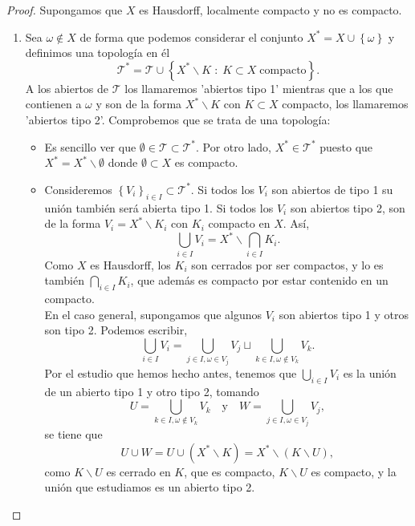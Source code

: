 \begin{proof}
Supongamos que $\displaystyle X $ es Hausdorff, localmente compacto y no es compacto.
\begin{enumerate}
	\item Sea $\displaystyle \omega \not\in X $ de forma que podemos considerar el conjunto $\displaystyle X^{*}=X \cup \left\{ \omega \right\}  $ y definimos una topología en él
		\[\mathcal{T}^{*}=\mathcal{T}\cup \left\{ X^{*}\backslash K \; :\; K \subset X \; \text{compacto}\right\}  .\]
	A los abiertos de $\displaystyle \mathcal{T} $ los llamaremos 'abiertos tipo 1' mientras que a los que contienen a $\displaystyle \omega  $ y son de la forma $\displaystyle X^{*} \backslash K $ con $\displaystyle K\subset X $ compacto, los llamaremos 'abiertos tipo 2'. Comprobemos que se trata de una topología:
	\begin{itemize}
	\item Es sencillo ver que $\displaystyle \emptyset \in \mathcal{T}\subset \mathcal{T}^{*} $. Por otro lado, $\displaystyle X^{*}\in \mathcal{T}^{*} $ puesto que $\displaystyle X^{*}=X^{*}\backslash \emptyset  $ donde $\displaystyle \emptyset \subset X $ es compacto.
	\item Consideremos $\displaystyle \left\{ V_{i}\right\} _{i \in I}\subset \mathcal{T}^{*} $. Si todos los $\displaystyle V_{i} $ son abiertos de tipo 1 su unión también será abierta tipo 1. Si todos los $\displaystyle V_{i} $ son abiertos tipo 2, son de la forma $\displaystyle V_{i}= X^{*}\backslash K_{i} $ con $\displaystyle K_{i} $ compacto en $\displaystyle X $. Así, 
		\[\bigcup_{i \in I}V_{i}=X^{*} \backslash \bigcap_{ i \in I}K_{i} .\]
	Como $\displaystyle X $ es Hausdorff, los $\displaystyle K_{i} $ son cerrados por ser compactos, y lo es también $\displaystyle \bigcap_{i \in I}K_{i} $, que además es compacto por estar contenido en un compacto. \\
	En el caso general, supongamos que algunos $\displaystyle V_{i} $ son abiertos tipo 1 y otros son tipo 2. Podemos escribir, 
	\[\bigcup_{i \in I}V_{i} = \bigcup_{j \in I , \omega\in V_{j}}V_{j}\sqcup\bigcup_{k \in I, \omega\not\in V_{k}}V_{k} .\]
Por el estudio que hemos hecho antes, tenemos que $\displaystyle \bigcup_{i \in I}V_{i} $ es la unión de un abierto tipo 1 y otro tipo 2, tomando
\[ U = \bigcup_{k \in I, \omega\not\in V_{k}}V_{k} \quad \text{y} \quad W =\bigcup_{j \in I , \omega\in V_{j}}V_{j} ,\]
se tiene que 
\[U \cup W = U \cup \left(X^{*}\backslash K\right)=X^{*}\backslash\left(K\backslash U\right),\]
como $\displaystyle K\backslash U $ es cerrado en $\displaystyle K $, que es compacto, $\displaystyle K\backslash U $ es compacto, y la unión que estudiamos es un abierto tipo 2.

\end{itemize}
\end{enumerate}
\end{proof}
